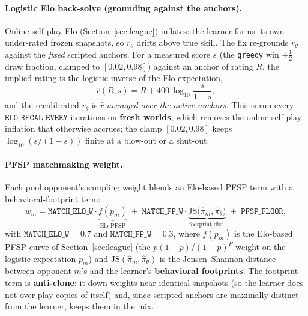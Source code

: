 \documentclass[11pt]{article}
\begin{document}
\paragraph{Logistic Elo back-solve (grounding against the anchors).} Online self-play Elo
(Section~\ref{sec:league}) inflates: the learner farms its own under-rated frozen snapshots, so
$r_\theta$ drifts above true skill. The fix re-grounds $r_\theta$ against the \emph{fixed} scripted
anchors. For a measured score $s$ (the \texttt{greedy} win $+\tfrac12$\,draw fraction, clamped to
$[0.02,0.98]$) against an anchor of rating $R$, the implied rating is the logistic inverse of the Elo
expectation,
\begin{equation}
\hat r(R,s) = R + 400\,\log_{10}\!\frac{s}{1-s},
\label{eq:elo-backsolve}
\end{equation}
and the recalibrated $r_\theta$ is $\hat r$ \emph{averaged over the active anchors}. This is run every
$\texttt{ELO\_RECAL\_EVERY}$ iterations on \textbf{fresh worlds}, which removes the online self-play
inflation that otherwise accrues; the clamp $[0.02,0.98]$ keeps $\log_{10}(s/(1-s))$ finite at a
blow-out or a shut-out.

\paragraph{PFSP matchmaking weight.} Each pool opponent's sampling weight blends an Elo-based PFSP term
with a behavioral-footprint term:
\begin{equation}
w_m = \texttt{MATCH\_ELO\_W}\cdot \underbrace{f(p_m)}_{\text{Elo PFSP}}
    \;+\; \texttt{MATCH\_FP\_W}\cdot \underbrace{\mathrm{JS}\big(\hat\pi_m,\hat\pi_\theta\big)}_{\text{footprint dist.}}
    \;+\; \texttt{PFSP\_FLOOR},
\label{eq:match-weight}
\end{equation}
with $\texttt{MATCH\_ELO\_W}=0.7$ and $\texttt{MATCH\_FP\_W}=0.3$,
where $f(p_m)$ is the Elo-based PFSP curve of Section~\ref{sec:league} (the
$p(1-p)$/$(1-p)^P$ weight on the logistic expectation $p_m$) and
$\mathrm{JS}(\hat\pi_m,\hat\pi_\theta)$ is the Jensen--Shannon distance between opponent $m$'s and the
learner's \textbf{behavioral footprints}. The
footprint term is \textbf{anti-clone}: it down-weights near-identical snapshots (so the learner does not
over-play copies of itself) and, since scripted anchors are maximally distinct from the learner, keeps
them in the mix.
\end{document}
